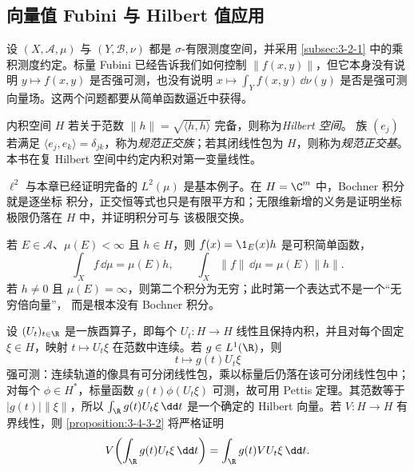 \subsection{向量值 Fubini 与 Hilbert 值应用}\label{subsec:3-4-3}

设 $(X,\mathcal A,\mu)$ 与 $(Y,\mathcal B,\nu)$ 都是 $\sigma$-有限测度空间，并采用
\cref{subsec:3-2-1} 中的乘积测度约定。标量 Fubini 已经告诉我们如何控制
$\|f(x,y)\|$，但它本身没有说明 $y\mapsto f(x,y)$ 是否强可测，也没有说明
$x\mapsto\int_Yf(x,y)\,\dd\nu(y)$ 是否是强可测向量场。这两个问题都要从简单函数逼近中获得。

\begin{definition}\label{def:3-4-3-hilbert}
内积空间 $H$ 若关于范数 $\|h\|=\sqrt{\langle h,h\rangle}$ 完备，则称为\emph{Hilbert 空间}。
族 $(e_j)$ 若满足 $\langle e_j,e_k\rangle=\delta_{jk}$，称为\emph{规范正交族}；若其闭线性包为
$H$，则称为\emph{规范正交基}。本书在复 Hilbert 空间中约定内积对第一变量线性。
\end{definition}

$\ell^2$ 与本章已经证明完备的 $L^2(\mu)$ 是基本例子。在 $H=\C^m$ 中，Bochner 积分就是逐坐标
积分，正交恒等式也只是有限平方和；无限维新增的义务是证明坐标极限仍落在 $H$ 中，并证明积分可与
该极限交换。

\begin{example}\label{ex:3-4-3-1}
若 $E\in\mathcal A$、$\mu(E)<\infty$ 且 $h\in H$，则
$f(x)=\1_E(x)h$ 是可积简单函数，
\[
  \int_Xf\,\dd\mu=\mu(E)h,
  \qquad
  \int_X\|f\|\,\dd\mu=\mu(E)\|h\|.
\]
若 $h\ne0$ 且 $\mu(E)=\infty$，则第二个积分为无穷；此时第一个表达式不是一个“无穷倍向量”，
而是根本没有 Bochner 积分。
\end{example}

\begin{example}[轨道平均]\label{ex:3-4-3-2}
设 $(U_t)_{t\in\R}$ 是一族酉算子，即每个 $U_t:H\to H$ 线性且保持内积，并且对每个固定
$\xi\in H$，映射
$t\mapsto U_t\xi$ 在范数中连续。若 $g\in L^1(\R)$，则
\[
  t\longmapsto g(t)U_t\xi
\]
强可测：连续轨道的像具有可分闭线性包，乘以标量后仍落在该可分闭线性包中；对每个
$\phi\in H^*$，标量函数 $g(t)\phi(U_t\xi)$ 可测，故可用 Pettis 定理。其范数等于
$|g(t)|\|\xi\|$，所以
$\int_\R g(t)U_t\xi\,\dd t$ 是一个确定的 Hilbert 向量。若 $V:H\to H$ 有界线性，则
\cref{proposition:3-4-3-2} 将严格证明
\[
 V\!\left(\int_\R g(t)U_t\xi\,\dd t\right)
 =\int_\R g(t)VU_t\xi\,\dd t.
\]
\end{example}

